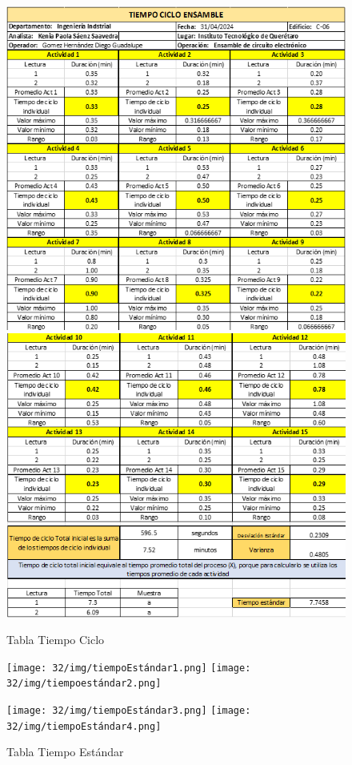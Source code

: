     \begin{figure}[H]
        \centering
        \includegraphics[scale=0.5]{32/img/tiempoCiclo1.png}
        \label{fig:enter-label}
        \centering
        \includegraphics[scale=0.5]{32/img/tiempoCiclo2.png}
        \caption{Tabla Tiempo Ciclo}
    \end{figure}
    \begin{figure}[H]
        \centering
        \texttt{[image: 32/img/tiempoEstándar1.png]}
        \label{fig:enter-label}
         \centering
        \texttt{[image: 32/img/tiempoestándar2.png]}
         \centering
    \end{figure}
    \begin{figure}[H]
        \texttt{[image: 32/img/tiempoEstándar3.png]}
         \centering
        \texttt{[image: 32/img/tiempoEstándar4.png]}
         \caption{Tabla Tiempo Estándar}
         \label{fig:enter-label}
    \end{figure}
    

